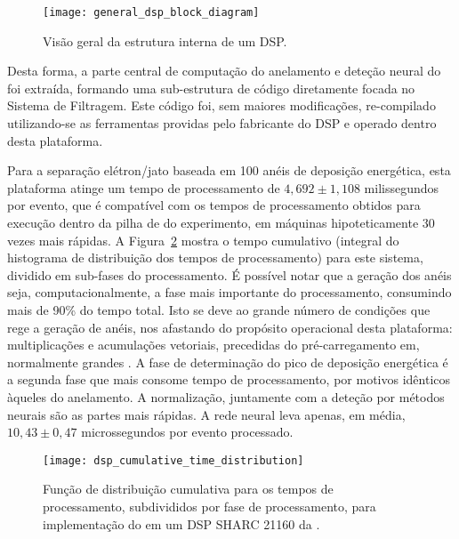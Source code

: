 \begin{figure}
\begin{center}
\texttt{[image: general\_dsp\_block\_diagram]}
\end{center}
\caption{Visão geral da estrutura interna de um DSP.}
\label{fig:dsp-inner}
\end{figure}

Desta forma, a parte central de computação do anelamento e deteção neural do
 foi extraída, formando uma sub-estrutura de código 
diretamente focada no Sistema de Filtragem. Este código foi, sem maiores
modificações, re-compilado utilizando-se as ferramentas providas pelo
fabricante do DSP e operado dentro desta plataforma. 

Para a separação elétron/jato baseada em 100 anéis de deposição energética,
esta plataforma atinge um tempo de processamento de $4,692 \pm 1,108$
milissegundos por evento, que é compatível com os tempos de processamento
obtidos para execução dentro da pilha de  do experimento, em
máquinas hipoteticamente 30 vezes mais rápidas. A Figura~\ref{fig:dsp-cumul}
mostra o tempo cumulativo (integral do histograma de distribuição dos tempos
de processamento) para este sistema, dividido em sub-fases do processamento. É
possível notar que a geração dos anéis seja, computacionalmente, a fase mais
importante do processamento, consumindo mais de 90\% do tempo total. Isto se
deve ao grande número de condições que rege a geração de anéis, nos afastando
do propósito operacional desta plataforma: multiplicações e acumulações
vetoriais, precedidas do pré-carregamento em, normalmente grandes
. A fase de determinação do pico de deposição energética é a
segunda fase que mais consome tempo de processamento, por motivos idênticos
àqueles do anelamento. A normalização, juntamente com a deteção por métodos
neurais são as partes mais rápidas. A rede neural leva apenas, em média,
$10,43\pm0,47$ microssegundos por evento processado.


\begin{figure}
\begin{center}
\texttt{[image: dsp\_cumulative\_time\_distribution]}
\caption{Função de distribuição cumulativa para os tempos de processamento,
subdivididos por fase de processamento, para implementação do
 em um DSP SHARC 21160 da .}
\label{fig:dsp-cumul}
\end{center}
\end{figure}


